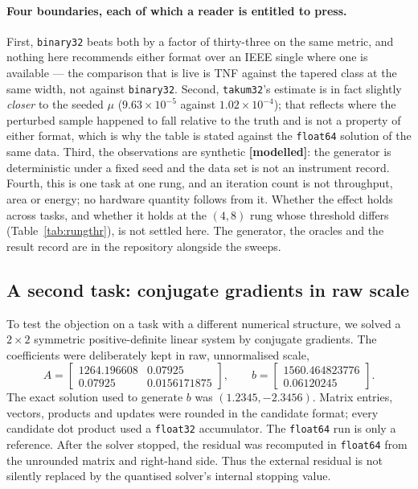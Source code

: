 \documentclass[11pt]{article}
\theoremstyle{definition}
\begin{document}
\paragraph{Four boundaries, each of which a reader is entitled to press.}
First, \texttt{binary32} beats both by a factor of thirty-three on the same
metric, and nothing here recommends either format over an IEEE single where one is
available --- the comparison that is live is TNF against the tapered class at the
same width, not against \texttt{binary32}. Second, \texttt{takum32}'s estimate is
in fact slightly \emph{closer} to the seeded $\mu$ ($9.63\times 10^{-5}$ against
$1.02\times 10^{-4}$); that reflects where the perturbed sample happened to fall
relative to the truth and is not a property of either format, which is why the
table is stated against the \texttt{float64} solution of the same data. Third, the
observations are synthetic \textbf{[modelled]}: the generator is deterministic
under a fixed seed and the data set is not an instrument record. Fourth, this is
one task at one rung, and an iteration count is not throughput, area or energy;
no hardware quantity follows from it. Whether the effect holds across tasks, and
whether it holds at the $(4,8)$ rung whose threshold differs
(Table~\ref{tab:rungthr}), is not settled here. The generator, the oracles and the
result record are in the repository alongside the sweeps.

\subsection{A second task: conjugate gradients in raw scale}
\label{sec:downstream-cg}

To test the objection on a task with a different numerical structure, we solved a
$2\times2$ symmetric positive-definite linear system by conjugate gradients.
The coefficients were deliberately kept in raw, unnormalised scale,
\[
A=\begin{bmatrix}1264.196608&0.07925\\0.07925&0.0156171875\end{bmatrix},
\qquad
b=\begin{bmatrix}1560.464823776\\0.06120245\end{bmatrix}.
\]
The exact solution used to generate $b$ was $(1.2345,-2.3456)$. Matrix entries,
vectors, products and updates were rounded in the candidate format; every
candidate dot product used a \texttt{float32} accumulator. The \texttt{float64}
run is only a reference. After the solver stopped, the residual was recomputed
in \texttt{float64} from the unrounded matrix and right-hand side. Thus the
external residual is not silently replaced by the quantised solver's internal
stopping value.
\end{document}
